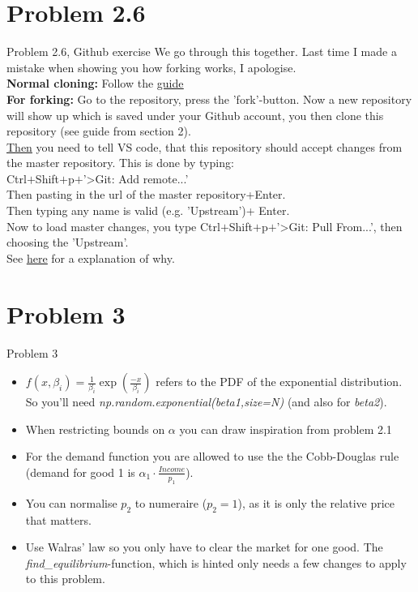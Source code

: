 \documentclass[10pt,danish,t,10pt]{beamer}
\newcommand{\code}[1]{\textit{#1}} %
\begin{document}
\section{Problem 2.6}
\begin{frame}{Problem 2.6, Github exercise}
    We go through this together. Last time I made a mistake when showing you how forking works, I apologise. \\
    \textbf{Normal cloning:} Follow the \href{https://numeconcopenhagen.netlify.app/guides/vscode-git/}{\underline{guide}} \\ 
    \textbf{For forking:} Go to the repository, press the 'fork'-button. Now a new repository will show up which is saved under your Github account, you then clone this repository (see guide from section 2). \\
    \underline{Then} you need to tell VS code, that this repository should accept changes from the master repository. This is done by typing: \\ Ctrl$+$Shift$+$p$+$'>Git: Add remote...'  \\
    Then pasting in the url of the master repository+Enter. \\ Then typing any name is valid (e.g. 'Upstream')+ Enter. \\
    Now to load master changes, you type Ctrl$+$Shift$+$p$+$'>Git: Pull From...', then choosing the 'Upstream'. \\
     See \href{https://stefanbauer.me/articles/how-to-keep-your-git-fork-up-to-date}{\underline{here}} for a explanation of why.
\end{frame}

\section{Problem 3}
\begin{frame}{Problem 3}
    \begin{itemize}
        \item $f\left(x,\beta_{i}\right)=\frac{1}{\beta_{i}}\exp\left(\frac{-x}{\beta_{i}}\right)$ refers to the PDF of the exponential distribution. So you'll need \code{np.random.exponential(beta1,size=N)} (and also for \code{beta2}).
        \item When restricting bounds on $\alpha$ you can draw inspiration from problem 2.1 
        \item For the demand function you are allowed to use the the Cobb-Douglas rule (demand for good 1 is $\alpha_{1}\cdot\frac{Income}{p_{1}}$). 
        \item You can normalise $p_{2}$ to numeraire ($p_{2}=1$), as it is only the relative price that matters.
        \item Use Walras' law so you only have to clear the market for one good. The \code{find\_equilibrium}-function, which is hinted only needs a few changes to apply to this problem.
    \end{itemize}
\end{frame}
\end{document}
